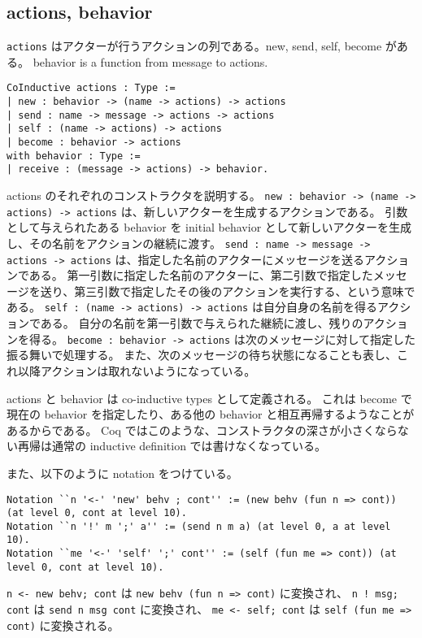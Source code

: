 \subsection{actions, behavior}
\texttt{actions} はアクターが行うアクションの列である。new, send, self, become がある。
behavior is a function from message to actions.

\begin{lstlisting}
CoInductive actions : Type :=
| new : behavior -> (name -> actions) -> actions
| send : name -> message -> actions -> actions
| self : (name -> actions) -> actions
| become : behavior -> actions
with behavior : Type :=
| receive : (message -> actions) -> behavior.
\end{lstlisting}

actions のそれぞれのコンストラクタを説明する。
\texttt{new : behavior -> (name -> actions) -> actions} は、新しいアクターを生成するアクションである。
引数として与えられたある behavior を initial behavior として新しいアクターを生成し、その名前をアクションの継続に渡す。
\texttt{send : name -> message -> actions -> actions} は、指定した名前のアクターにメッセージを送るアクションである。
第一引数に指定した名前のアクターに、第二引数で指定したメッセージを送り、第三引数で指定したその後のアクションを実行する、という意味である。
\texttt{self : (name -> actions) -> actions} は自分自身の名前を得るアクションである。
自分の名前を第一引数で与えられた継続に渡し、残りのアクションを得る。
\texttt{become : behavior -> actions} は次のメッセージに対して指定した振る舞いで処理する。
また、次のメッセージの待ち状態になることも表し、これ以降アクションは取れないようになっている。

actions と behavior は co-inductive types として定義される。
これは become で現在の behavior を指定したり、ある他の behavior と相互再帰するようなことがあるからである。
Coq ではこのような、コンストラクタの深さが小さくならない再帰は通常の inductive definition では書けなくなっている。

また、以下のように notation をつけている。

\begin{lstlisting}
Notation ``n '<-' 'new' behv ; cont'' := (new behv (fun n => cont)) (at level 0, cont at level 10).
Notation ``n '!' m ';' a'' := (send n m a) (at level 0, a at level 10).
Notation ``me '<-' 'self' ';' cont'' := (self (fun me => cont)) (at level 0, cont at level 10).
\end{lstlisting}

\texttt{n <- new behv; cont} は \texttt{new behv (fun n => cont)} に変換され、
\texttt{n ! msg; cont} は \texttt{send n msg cont} に変換され、
\texttt{me <- self; cont} は \texttt{self (fun me => cont)} に変換される。

